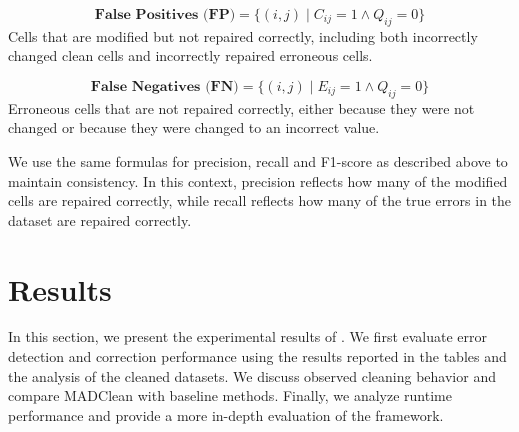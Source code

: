 \[
\textbf{False Positives (FP)} = \{(i,j) \mid C_{ij} = 1 \land Q_{ij} = 0\}
\]
\indent Cells that are modified but not repaired correctly, including both incorrectly changed clean cells and incorrectly repaired erroneous cells.

\[
\textbf{False Negatives (FN)} = \{(i,j) \mid E_{ij} = 1 \land Q_{ij} = 0\}
\]
\indent Erroneous cells that are not repaired correctly, either because they were not changed or because they were changed to an incorrect value.

We use the same formulas for precision, recall and F1-score as described above to maintain consistency. 
In this context, precision reflects how many of the modified cells are repaired correctly, while recall reflects how many of the true errors in the dataset are repaired correctly.

\section{Results}
In this section, we present the experimental results of . 
We first evaluate error detection and correction performance using the results reported in the tables and the analysis of the cleaned datasets. 
We discuss observed cleaning behavior and compare MADClean with baseline methods. 
Finally, we analyze runtime performance and provide a more in-depth evaluation of the framework.

